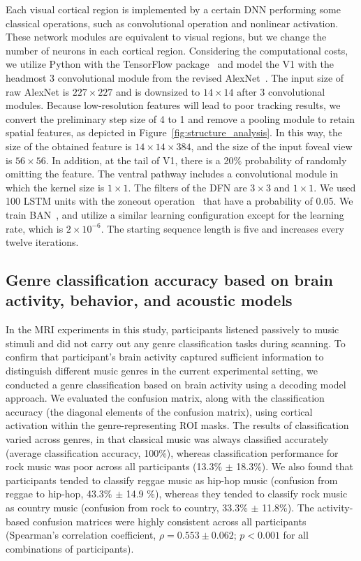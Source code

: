 \documentclass[journal]{IEEEtran}
\begin{document}
Each visual cortical region is implemented by a certain DNN performing some classical operations, such as convolutional operation and nonlinear activation. 
These network modules are equivalent to visual regions, but we change the number of neurons in each cortical region.
Considering the computational costs, we utilize Python with the TensorFlow package~\cite{abadi2015tensorflow} 
and model the V1 with the headmost 3 convolutional module from the revised AlexNet~\cite{imagenet}. 
The input size of raw AlexNet is $227 \times 227$ and is downsized to $14 \times 14$ after 3 convolutional modules. 
Because low-resolution features will lead to poor tracking results, 
we convert the preliminary step size of 4 to 1 
and remove a pooling module to retain spatial features, as depicted in Figure~\ref{fig:structure_analysis}. 
In this way, the size of the obtained feature is $14 \times 14 \times 384$, and the size of the input foveal view is $56 \times 56$.
In addition, at the tail of V1, there is a 20$\%$ probability of randomly omitting the feature. 
The ventral pathway includes a convolutional module in which the kernel size is $1 \times 1$. 
The filters of the DFN are $3 \times 3$ and $1 \times 1$.
We used 100 LSTM units with the zoneout operation~\cite{zoneout} that have a probability of 0.05.
We train BAN~\cite{curriculum}, and utilize a similar learning configuration except for the learning rate, which is $2 \times 10 ^{-6}$.
The starting sequence length is five and increases every twelve iterations. 


\subsection{Genre classification accuracy based on brain activity, behavior, and acoustic models}
In the MRI experiments in this study, participants listened passively to music stimuli and did not carry out any genre classification tasks during scanning.
To confirm that participant's brain activity captured sufficient information to distinguish different music genres in the current experimental setting, we conducted a genre classification based on brain activity using a decoding model approach.
We evaluated the confusion matrix, along with the classification accuracy (the diagonal elements of the confusion matrix), using cortical activation within the genre-representing ROI masks.
The results of classification varied across genres, in that classical music was always classified accurately (average classification accuracy, 100\%), whereas classification performance for rock music was poor across all participants (13.3\% $\pm$ 18.3\%).
We also found that participants tended to classify reggae music as hip-hop music (confusion from reggae to hip-hop, 43.3\% $\pm$ 14.9 \%), whereas they tended to classify rock music as country music (confusion from rock to country, 33.3\% $\pm$ 11.8\%).
The activity-based confusion matrices were highly consistent across all participants (Spearman's correlation coefficient, $ \rho = 0.553 \pm 0.062$; $ p < 0.001 $ for all combinations of participants).
\end{document}
